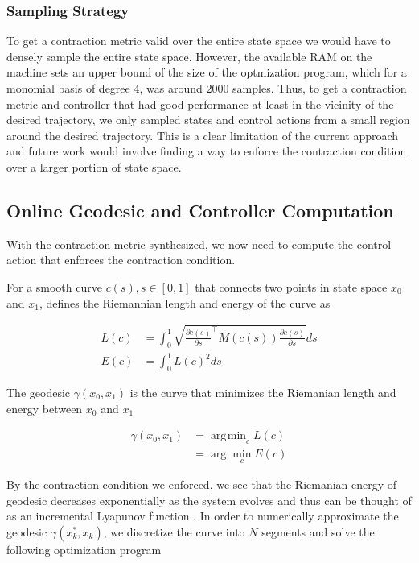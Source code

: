 \documentclass[journal]{IEEEtran}
\DeclareMathOperator*{\argmin}{\arg\!\min}
\begin{document}
\subsubsection{Sampling Strategy}
To get a contraction metric valid over the entire state space we would have to densely sample the entire state space. However, the available RAM on the machine sets an upper bound of the size of the optmization program, which for a monomial basis of degree $4$, was around $2000$ samples. Thus, to get a contraction metric and controller that had good performance at least in the vicinity of the desired trajectory, we only sampled states and control actions from a small region around the desired trajectory. This is a clear limitation of the current approach and future work would involve finding a way to enforce the contraction condition over a larger portion of state space.

\subsection{Online Geodesic and Controller Computation}
With the contraction metric synthesized, we now need to compute the control action that enforces the contraction condition.

For a smooth curve $c(s), s\in [0, 1]$ that connects two points in state space $x_0$ and $x_1$, \autocite{manchesterControlContractionMetrics2017} defines the Riemannian length and energy of the curve as

\begin{equation}
	\begin{aligned}
		L(c) &= \int_0^1 \sqrt{\frac{\partial{c(s)}}{\partial{s}} ^\top M(c(s)) \frac{\partial{c(s)}}{\partial{s}}} ds \\
		E(c) &= \int_0^1 L(c)^2 ds
	\end{aligned}
	\label{eq:geodesic_length_energy}
\end{equation}

The geodesic $\gamma(x_0, x_1)$ is the curve that minimizes the Riemanian length and energy between $x_0$ and $x_1$

\begin{equation}
	\label{eq:geodesic}
	\begin{aligned}
		\gamma(x_0, x_1) &= \argmin_{c} L(c) \\
		&= \arg \min_{c} E(c)
	\end{aligned}
\end{equation}

By the contraction condition we enforced, we see that the Riemanian energy of geodesic decreases exponentially as the system evolves and thus can be thought of as an incremental Lyapunov function \autocite{manchesterControlContractionMetrics2017}. In order to numerically approximate the geodesic $\gamma(x^*_k, x_k)$, we discretize the curve into $N$ segments and solve the following optimization program
\end{document}
